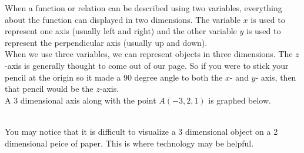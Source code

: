\documentclass[12pt,fleqn]{book}
\begin{document}
When a function or relation can be described using two variables, everything about the function can displayed in two dimensions.  The variable $x$ is used to represent one axis (usually left and right) and the other variable $y$ is used to represent the perpendicular axis (usually up and down).
\\[1em]
When we use three variables, we can represent objects in three dimensions.  The $z$-axis is generally thought to come out of our page.  So if you were to stick your pencil at the origin so it made a 90 degree angle to both the $x$- and $y$- axis, then that pencil would be the $z$-axis.
\\[1em]
A 3 dimensional axis along with the point $A(-3,2,1)$ is graphed below.\\[1em]
\\[1em]
You may notice that it is difficult to visualize a 3 dimensional object on a 2 dimensional peice of paper.  This is where technology may be helpful.
\end{document}
